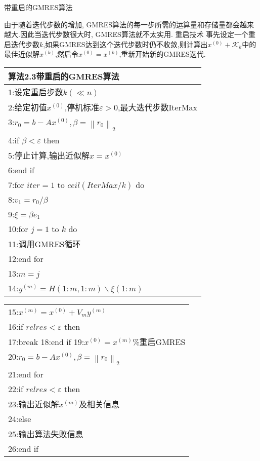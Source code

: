 \documentclass[notheorems,serif]{beamer}
\renewcommand{\normalsize}{\wuhao}
\newcommand{\wuhao}{\fontsize{10.5pt}{\baselineskip}\selectfont}
\begin{document}
\begin{frame}


{\color{blue}\Large 带重启的GMRES算法}

\quad

\normalsize
由于随着迭代步数的增加, GMRES算法的每一步所需的运算量和存储量都会越来越大.因此当迭代步数很大时, GMRES算法就不太实用.
{\color{blue}重启技术}
事先设定一个重启迭代步数$k$,如果GMRES达到这个迭代步数时仍不收敛,则计算出$x^{(0)}+\mathcal{K}_{k}$中的最佳近似解$x^{(k)}$,然后令$x^{(0)}=x^{(k)}$,重新开始新的GMRES迭代.\\
\end{frame}

\begin{frame}
\begin{tabular}{l}
	\hline
	{\color{blue}算法2.3}带重启的GMRES算法\\
	\hline
	1:设定重启步数$k(\ll n )$\\
	2:给定初值$x^{(0)}$,停机标准$\varepsilon>0$,最大迭代步数IterMax\\
	3:$r_{0}=b-A x^{(0)}, \beta=\left\|r_{0}\right\|_{2}$\\
	4:if $\beta<\varepsilon$ then\\
	5:\qquad 停止计算,输出近似解$x=x^{(0)}$\\
	6:end if\\
	7:for $iter=1$ to $ceil(IterMax/k)$ do\\
	8:\qquad $v_{1}=r_{0} / \beta$\\
	9:\qquad $\xi=\beta e_{1}$\\
	10:\qquad for $j= 1$ to $k$ do\\
	11:\qquad \qquad 调用GMRES循环\\
	12:\qquad end for \\
	13:\qquad $m=j$\\
	14:\qquad $y^{(m)}=H(1 : m, 1 : m) \backslash \xi(1 : m)$\\
\end{tabular}
\end{frame}
	
\begin{frame}
\begin{tabular}{l}
	15:\qquad $x^{(m)}=x^{(0)}+V_{m} y^{(m)}$\\
	16:\qquad if $relres<\varepsilon$ then \qquad {\color{red}\%收敛。退出循环}\\
	17:\qquad \qquad break
	18:\qquad end if
	19:\qquad $x^{(0)}=x^{(m)}${\color{red}\%重启GMRES}\\
	20:\qquad $r_{0}=b-A x^{(0)}, \beta=\left\|r_{0}\right\|_{2}$\\
	21:end for \\
	22:if $relres<\varepsilon$ then\\
	23:\qquad 输出近似解$x^{(m)}$及相关信息\\
	24:else\\
	25:\qquad 输出算法失败信息\\
	26:end if\\
	\hline
\end{tabular}
\end{frame}
\end{document}
